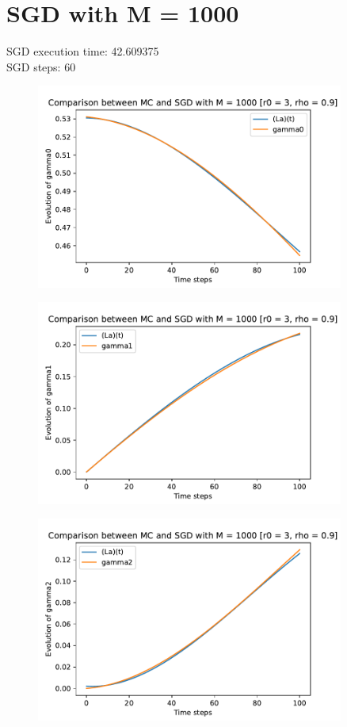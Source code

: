 \documentclass[a4paper,11pt,openright]{report}
\begin{document}
\section{SGD with M = 1000}
SGD execution time: 42.609375 \\
SGD steps: 60

\begin{figure}[H]
\centering
\includegraphics[width=0.9\textwidth]{gamma0 SGD 1000.pdf}
\end{figure}
\begin{figure}[H]
\centering
\includegraphics[width=0.9\textwidth]{gamma1 SGD 1000.pdf}
\end{figure}
\begin{figure}[H]
\centering
\includegraphics[width=0.9\textwidth]{gamma2 SGD 1000.pdf}
\end{figure}
\end{document}
